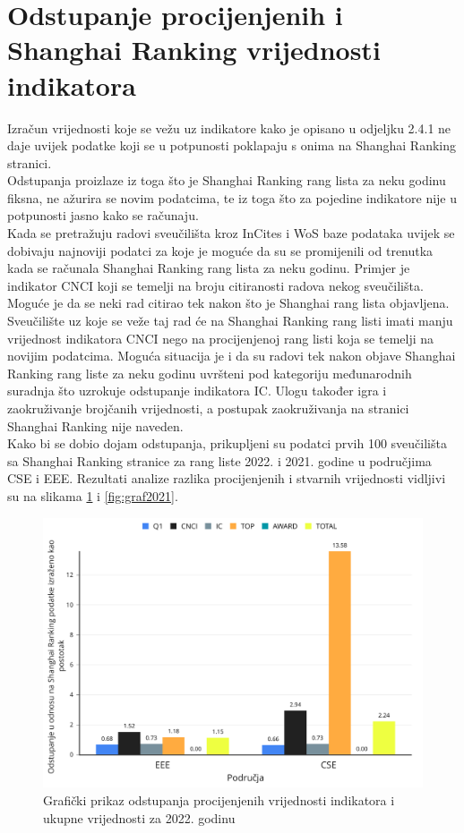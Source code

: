 \documentclass[times, utf8, zavrsni]{fer}
\begin{document}
\section{Odstupanje procijenjenih i Shanghai Ranking vrijednosti indikatora}
Izračun vrijednosti koje se vežu uz indikatore kako je opisano u odjeljku 2.4.1 ne daje uvijek podatke koji se u potpunosti poklapaju s onima na 
Shanghai Ranking stranici.
\\Odstupanja proizlaze iz toga što je Shanghai Ranking rang lista za neku godinu fiksna, ne ažurira se novim podatcima, te iz toga što za pojedine 
indikatore nije u potpunosti jasno kako se računaju. \\Kada se pretražuju radovi sveučilišta
kroz InCites i WoS baze podataka uvijek se dobivaju najnoviji podatci za koje je moguće da su se promijenili od trenutka kada se računala Shanghai Ranking rang lista za neku godinu.
Primjer je indikator CNCI koji se temelji na broju citiranosti radova nekog sveučilišta. Moguće je da se neki rad citirao tek nakon što je Shanghai rang lista objavljena. Sveučilište uz 
koje se veže taj rad će na Shanghai Ranking rang listi imati manju vrijednost indikatora CNCI nego na procijenjenoj rang listi koja se temelji na novijim podatcima. 
Moguća situacija je i da su radovi tek nakon objave Shanghai Ranking rang liste za neku godinu uvršteni pod kategoriju međunarodnih suradnja što uzrokuje odstupanje 
indikatora IC. Ulogu također igra i zaokruživanje brojčanih vrijednosti, a postupak zaokruživanja na stranici Shanghai Ranking nije naveden.
\\Kako bi se dobio dojam odstupanja, prikupljeni su podatci prvih 100 sveučilišta sa Shanghai Ranking stranice za rang liste 2022. i 2021. godine u područjima CSE i EEE. 
Rezultati analize razlika procijenjenih i stvarnih vrijednosti vidljivi su na slikama \ref{fig:graf2022} i \ref{fig:graf2021}.
\begin{figure}[htb]
    \centering
    \includegraphics[scale=0.26]{EEE2022.png}
    \caption{Grafički prikaz odstupanja procijenjenih vrijednosti indikatora i ukupne vrijednosti  za 2022. godinu}
    \label{fig:graf2022}
    \end{figure}
    \FloatBarrier
\end{document}
